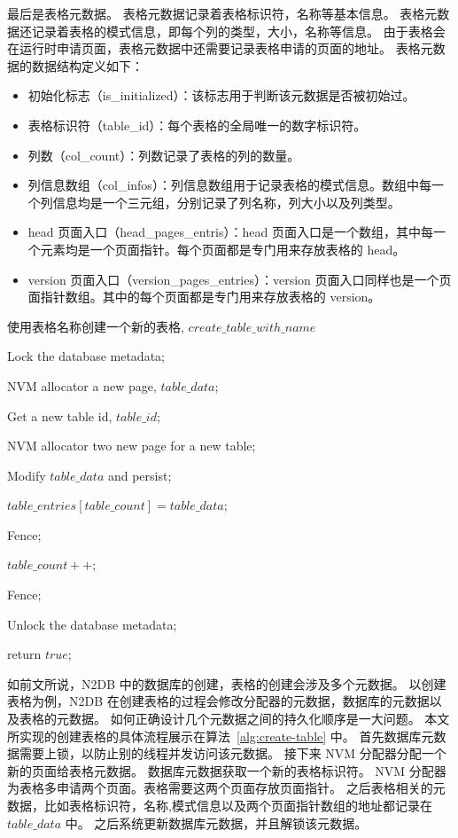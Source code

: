 最后是表格元数据。
表格元数据记录着表格标识符，名称等基本信息。
表格元数据还记录着表格的模式信息，即每个列的类型，大小，名称等信息。
由于表格会在运行时申请页面，表格元数据中还需要记录表格申请的页面的地址。
表格元数据的数据结构定义如下：
\begin{itemize}
    \item 初始化标志（is\_initialized）：该标志用于判断该元数据是否被初始过。
    \item 表格标识符（table\_id）：每个表格的全局唯一的数字标识符。
    \item 列数（col\_count）：列数记录了表格的列的数量。
    \item 列信息数组（col\_infos）：列信息数组用于记录表格的模式信息。数组中每一个列信息均是一个三元组，分别记录了列名称，列大小以及列类型。
    \item head 页面入口（head\_pages\_entris）：head 页面入口是一个数组，其中每一个元素均是一个页面指针。每个页面都是专门用来存放表格的 head。
    \item version 页面入口（version\_pages\_entries）：version 页面入口同样也是一个页面指针数组。其中的每个页面都是专门用来存放表格的 version。
\end{itemize}


\begin{algorithm}[ht]
    \caption{使用表格名称创建一个新的表格, $create\_table\_with\_name$}
    \label{alg:create-table}
    \BlankLine
    Lock the database metadata;


    NVM allocator a new page, $table\_data$;

    Get a new table id, $table\_id$;

    NVM allocator two new page for a new table;

    Modify $table\_data$ and persist;

    $table\_entries[table\_count] = table\_data$;

    Fence;

    $table\_count++$;

    Fence;

    Unlock the database metadata;

    return $true$;
\end{algorithm}

如前文所说，N2DB 中的数据库的创建，表格的创建会涉及多个元数据。
以创建表格为例，N2DB 在创建表格的过程会修改分配器的元数据，数据库的元数据以及表格的元数据。
如何正确设计几个元数据之间的持久化顺序是一大问题。
本文所实现的创建表格的具体流程展示在算法~\ref{alg:create-table} 中。
首先数据库元数据需要上锁，以防止别的线程并发访问该元数据。
接下来 NVM 分配器分配一个新的页面给表格元数据。
数据库元数据获取一个新的表格标识符。
NVM 分配器为表格多申请两个页面。表格需要这两个页面存放页面指针。
之后表格相关的元数据，比如表格标识符，名称,模式信息以及两个页面指针数组的地址都记录在 $table\_data$ 中。
之后系统更新数据库元数据，并且解锁该元数据。

